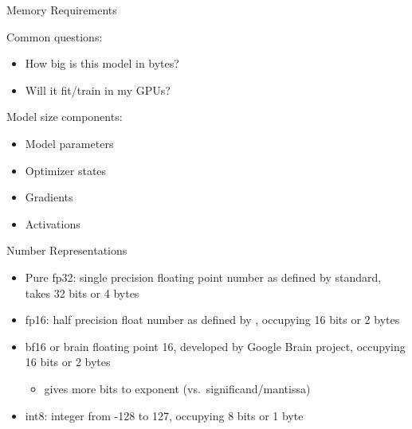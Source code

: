 
\begin{vbframe}{Memory Requirements}

\vfill

Common questions: \newline

\begin{itemize}
 	\item How big is this model in bytes?
	\item Will it fit/train in my GPUs?
\end{itemize}

\vskip8mm

Model size components: \newline

\begin{itemize}
 	\item Model parameters
	\item Optimizer states
	\item Gradients
	\item Activations
\end{itemize}

\vfill

\end{vbframe}


\begin{vbframe}{Number Representations}

\vfill

\begin{itemize}
 	\item Pure fp32: single precision floating point number as defined by  standard, takes 32 bits or 4 bytes
 	\item fp16: half precision float number as defined by , occupying 16 bits or 2 bytes 
    \item bf16 or brain floating point 16, developed by Google Brain project, occupying 16 bits or 2 bytes
\begin{itemize}
\item gives more bits to exponent (vs.\ significand/mantissa)
\end{itemize}

	\item int8: integer from -128 to 127, occupying 8 bits or 1 byte
\end{itemize}

\vfill

\end{vbframe}

